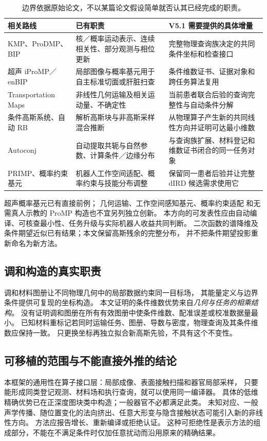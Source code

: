 \documentclass[11pt,a4paper]{article}
\numberwithin{equation}{section}
\theoremstyle{definition}
\begin{document}
\begin{table}[ht]
\centering\small
\begin{tabularx}{\linewidth}{p{.24\linewidth}YY}
\toprule
相关路线 & 已有职责 & V5.1 需要提供的具体增量\\
\midrule
KMP、ProDMP、BIP & 核／概率运动表示、连续相关性、部分观测与相位更新 & 完整物理查询族决定的共同条件坐标和检查接口\\
超声 iProMP／enBIP & 局部图像与概率基元用于自主标准切面或肝脏扫查 & 条件维数证书、证据对象和跨任务算法复用\\
Transportation Maps & 非线性几何运输及相关运动量、不确定性 & 当前患者联合后验的查询完整性与自动条件分解\\
条件高斯系统、自动 RB & 解析高斯块与非高斯采样混合推断 & 从物理算子产生新的共同线性方向并证明可达最小维数\\
Autoconj & 自动提取共轭与自然参数、计算条件／边缘分布 & 与查询族扩展、材料登记和维数证书闭合的同一任务对象\\
PRIMP、概率约束基元 & 机器人工作空间适配、概率约束与技能分布调整 & 保留同一患者后验并让完整 dIRD 候选需求使用它\\
\bottomrule
\end{tabularx}
\caption{边界依据原始论文，不以某篇论文假设简单就否认其已经完成的职责。}
\end{table}

超声概率基元已有直接前例\cite{uspromp,usenbip}；
几何运输\cite{transport}、工作空间感知基元\cite{primp}、概率约束适配\cite{constrained}
和无需真人示教的 ProMP 构造\cite{demofree}也不宜另列独立创新。
本方向的可发表性应由自动编译、可核查最小性、任务升级与实际机器人收益共同判断。
二次函数的谱降维及条件期望近似已有结果\cite{zahm}；本文保留高斯残余的完整分布，
并不把条件期望投影重新命名为新方法。

\subsection{调和构造的真实职责}
调和材料图册让不同物理几何中的局部数据约束同一目标场，
其能量定义与边界条件提供可复现的坐标构造。
本文证明的条件维数优势来自\emph{几何与任务的相乘结构}。
没有证明调和图册在所有有效图册中使条件维数、配准误差或校准数据量最小。
已知材料重标记若同时运输任务、图册、导数与密度，物理查询及其条件维数应保持一致。
只更换坐标再独立拟合新高斯先验，不具有这个不变性。

\subsection{可移植的范围与不能直接外推的结论}
本框架的通用性在算子接口层：局部成像、表面接触扫描和器官局部采样，
只要能形成同类登记观测、材料场和执行查询，就可以使用同一编译器。
具体的低维精确优势已在正深度图块类中构造；一般器官不必都满足此类。
未知对应、一般声学传播、随位置变化的法向挤出、任意大形变与隐含接触状态可能引入新的非线性方向。
方法应报告增长、重新编译或拒绝认证。
这种可拒绝性是表示方法的组成部分，不能在不满足条件时仅加任意扰动而沿用原来的精确结果。
\end{document}
